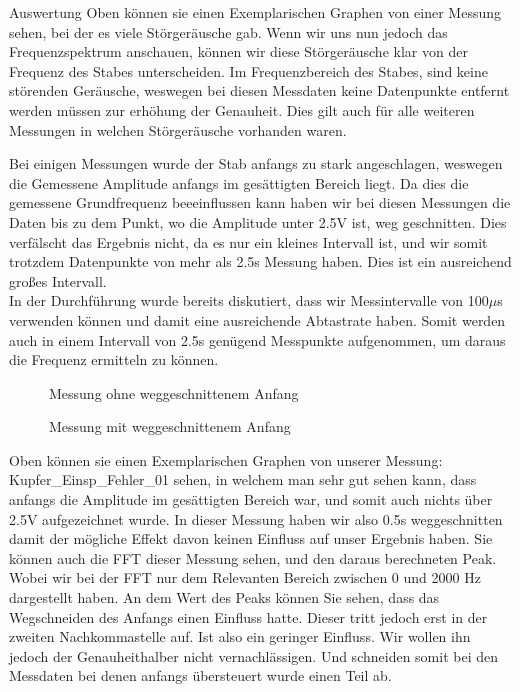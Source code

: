 \documentclass[twoside]{protokoll}
\begin{document}
\begin{aufgabe}{Auswertung}
Oben können sie einen Exemplarischen Graphen von einer Messung sehen, bei der es viele Störgeräusche gab.
Wenn wir uns nun jedoch das Frequenzspektrum anschauen, können wir diese Störgeräusche klar von der Frequenz des Stabes unterscheiden.
Im Frequenzbereich des Stabes, sind keine störenden Geräusche, weswegen bei diesen Messdaten keine Datenpunkte entfernt werden müssen zur erhöhung der Genauheit.
Dies gilt auch für alle weiteren Messungen in welchen Störgeräusche vorhanden waren. 

Bei einigen Messungen wurde der Stab anfangs zu stark angeschlagen, weswegen die Gemessene Amplitude anfangs im gesättigten Bereich liegt.
Da dies die gemessene Grundfrequenz beeeinflussen kann  haben wir bei diesen Messungen die Daten bis zu dem Punkt, wo die Amplitude unter 2.5V ist, weg geschnitten.
Dies verfälscht das Ergebnis nicht, da es nur ein kleines Intervall ist, und wir somit trotzdem Datenpunkte von mehr als 2.5s Messung haben.
Dies ist ein ausreichend großes Intervall.\\
In der Durchführung wurde bereits diskutiert, dass wir Messintervalle von 100$\mu$s verwenden können und damit eine ausreichende Abtastrate haben.
Somit werden auch in einem Intervall von 2.5s  genügend Messpunkte aufgenommen, um daraus die Frequenz ermitteln zu können.

\begin{figure}[H]
  \centering
  \caption{Messung ohne weggeschnittenem Anfang}
  \hfill
\end{figure}

\begin{figure}[H]
  \centering
  \caption{Messung mit weggeschnittenem Anfang}
  \hfill
\end{figure}


Oben können sie einen Exemplarischen Graphen von unserer Messung: Kupfer\_Einsp\_Fehler\_01 sehen, in welchem man sehr gut sehen kann, dass anfangs die Amplitude im gesättigten Bereich war, und somit auch nichts über 2.5V aufgezeichnet wurde.
In dieser Messung haben wir also 0.5s weggeschnitten damit der mögliche Effekt davon keinen Einfluss auf unser Ergebnis haben.
Sie können auch die FFT dieser Messung sehen, und den daraus berechneten Peak.
Wobei wir bei der FFT nur dem Relevanten Bereich zwischen 0 und 2000 Hz dargestellt haben.
An dem Wert des Peaks können Sie sehen, dass das Wegschneiden des Anfangs einen Einfluss hatte.
Dieser tritt jedoch erst in der zweiten Nachkommastelle auf.
Ist also ein geringer Einfluss.
Wir wollen ihn jedoch der Genauheithalber nicht vernachlässigen.
Und schneiden somit bei den Messdaten bei denen anfangs übersteuert wurde einen Teil ab. 



\end{aufgabe}
\end{document}
